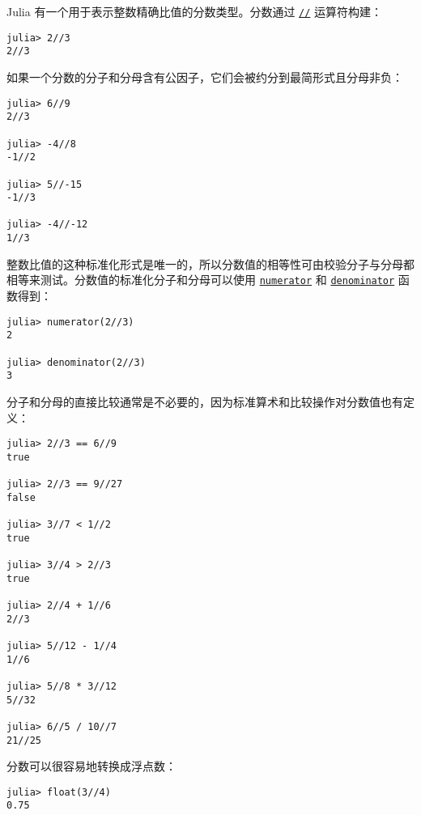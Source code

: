 Julia 有一个用于表示整数精确比值的分数类型。分数通过 \hyperlink{17539582191808611917}{\texttt{//}} 运算符构建：




\begin{verbatim}
julia> 2//3
2//3
\end{verbatim}



如果一个分数的分子和分母含有公因子，它们会被约分到最简形式且分母非负：




\begin{verbatim}
julia> 6//9
2//3

julia> -4//8
-1//2

julia> 5//-15
-1//3

julia> -4//-12
1//3
\end{verbatim}



整数比值的这种标准化形式是唯一的，所以分数值的相等性可由校验分子与分母都相等来测试。分数值的标准化分子和分母可以使用 \hyperlink{7885506453580572157}{\texttt{numerator}} 和 \hyperlink{12407209279719593434}{\texttt{denominator}} 函数得到：




\begin{verbatim}
julia> numerator(2//3)
2

julia> denominator(2//3)
3
\end{verbatim}



分子和分母的直接比较通常是不必要的，因为标准算术和比较操作对分数值也有定义：




\begin{verbatim}
julia> 2//3 == 6//9
true

julia> 2//3 == 9//27
false

julia> 3//7 < 1//2
true

julia> 3//4 > 2//3
true

julia> 2//4 + 1//6
2//3

julia> 5//12 - 1//4
1//6

julia> 5//8 * 3//12
5//32

julia> 6//5 / 10//7
21//25
\end{verbatim}



分数可以很容易地转换成浮点数：




\begin{verbatim}
julia> float(3//4)
0.75
\end{verbatim}



